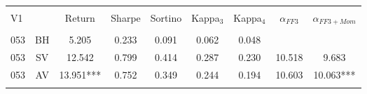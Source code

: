 
\begin{tabular}{@{\extracolsep{5pt}} Hcccccccc} 
\\[-1.8ex]\hline 
\hline \\[-1.8ex] 
V1 &  & Return & Sharpe & Sortino & Kappa$_{3}$ & Kappa$_{4}$ & $\alpha_{FF3}$ & $\alpha_{FF3+Mom}$ \\ 
\hline \\[-1.8ex] 
053 & BH & 5.205 & 0.233 & 0.091 & 0.062 & 0.048 &  &  \\ 
053 & SV & 12.542 & 0.799 & 0.414 & 0.287 & 0.230 & 10.518 & 9.683 \\ 
053 & AV & 13.951*** & 0.752 & 0.349 & 0.244 & 0.194 & 10.603 & 10.063*** \\ 
\hline \\[-1.8ex] 
\end{tabular} 
